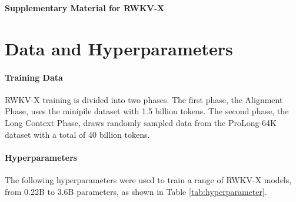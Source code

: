
\onecolumn

\begin{center}
    {\LARGE \textbf{Supplementary Material for RWKV-X}}\\[2em]
\end{center}

\section{Data and Hyperparameters}
\label{sec:data_Hyperparameters}

\paragraph{Training Data}
RWKV-X training is divided into two phases. 
The first phase, the Alignment Phase, uses the minipile dataset with 1.5 billion tokens. 
The second phase, the Long Context Phase, draws randomly sampled data from the ProLong-64K dataset with a total of 40 billion tokens.

\paragraph{Hyperparameters}
The following hyperparameters were used to train a range of RWKV-X models, from 0.22B to 3.6B parameters, as shown in Table \ref{tab:hyperparameter}.

\begin{table}[h!]
\centering
{}
\caption{Training hyperparameters and compute configurations for RWKV-X models.}
\label{tab:hyperparameter}
\end{table}


